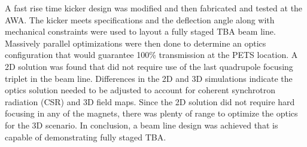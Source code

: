 A fast rise time kicker design was modified and then fabricated and tested 
at the AWA. 
The kicker meets specifications and the deflection angle 
along with mechanical constraints were used to layout 
a fully staged TBA beam line. 
Massively parallel optimizations were then done to 
determine an optics configuration that would guarantee 
100\% transmission at the PETS location. 
A 2D solution was found that did not require use of the
last quadrupole focusing triplet in the beam  line. 
Differences in the 2D and 3D simulations indicate the optics 
solution needed to be adjusted to account for coherent synchrotron radiation (CSR) and 3D field maps. 
Since the 2D solution did not require hard focusing in any of the magnets, 
there was plenty of range to optimize the optics for the 3D scenario.
In conclusion, a beam line design was achieved that is capable of 
demonstrating fully staged TBA. 










